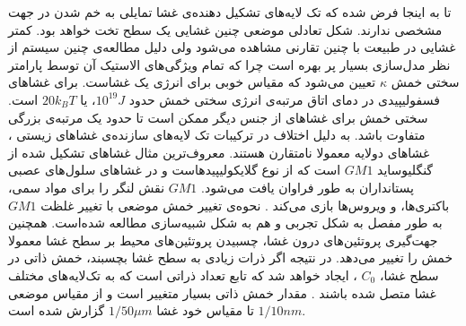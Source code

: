 تا به اینجا فرض شده که تک لایه‌های تشکیل دهنده‌ی غشا تمایلی به خم شدن در جهت مشخصی ندارند. شکل تعادلی موضعی چنین غشایی یک سطح تخت خواهد بود. کمتر غشایی در طبیعت با چنین تقارنی مشاهده می‌شود ولی دلیل مطالعه‌ی چنین سیستم از نظر مدل‌سازی بسیار پر بهره است چرا که تمام ویژگی‌های الاستیک آن توسط پارامتر سختی خمش
$\kappa$
تعیین می‌شود که مقیاس خوبی برای انرژی یک غشاست. برای غشاهای فسفولیپیدی در دمای اتاق مرتبه‌ی انرژی سختی خمش حدود
$10^{19}J$،
یا
$20k_BT$
است. سختی خمش برای غشاهای از جنس دیگر ممکن است تا حدود یک مرتبه‌ی بزرگی متفاوت باشد. به دلیل اختلاف در ترکیبات تک لایه‌های سازنده‌ی غشاهای زیستی
\cite{Meer2008}
، غشاهای دولایه معمولا نامتقارن هستند. معروف‌ترین مثال غشاهای تشکیل شده از گنگلیوساید 
$GM1$
است که از نوع گلایکولیپید‌هاست
و در غشاهای سلول‌های عصبی پستانداران به طور فراوان یافت می‌شود. 
$GM1$
نقش لنگر را برای مواد سمی، باکتری‌ها، و ویروس‌ها بازی می‌کند
\cite{Ewers2010}
. نحوه‌ی تغییر خمش موضعی با تغییر غلظت 
$GM1$
به طور مفصل به شکل تجربی
\cite{Bhatia2018, Raktim2018}
و هم به شکل شبیه‌سازی
\cite{Raktim2018, Sreekumari2018}
مطالعه شده‌است. همچنین جهت‌گیری پروتئین‌های درون غشا، چسبیدن پروتئین‌های محیط بر سطح غشا معمولا خمش را تغییر می‌دهد. در نتیجه اگر ذرات زیادی به سطح غشا بچسبند، خمش ذاتی در سطح غشا،
$C_0$
، ایجاد خواهد شد
\cite{Lipowsky2002}
که تابع تعداد ذراتی‌ است که به تک‌لایه‌های مختلف غشا متصل شده باشند
\cite{Breidenich2000}
. مقدار خمش ذاتی بسیار متغییر است و از مقیاس موضعی 
$1/10nm$
تا مقیاس خود غشا
$1/50\mu m$
گزارش شده است.
